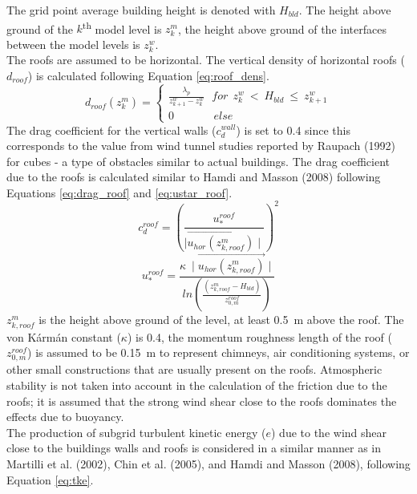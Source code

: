 %
The grid point average building height is denoted with $H_{bld}$. The height above ground of
the $k$\textsuperscript{th} model level is $z^{m}_{k}$, the height above ground of the interfaces
between the model levels is $z^{w}_{k}$. \\
%
The roofs are assumed to be horizontal. The vertical density of horizontal roofs ($d_{roof}$)
is calculated following Equation \ref{eq:roof_dens}.
%
\begin{equation}
\label{eq:roof_dens}
d_{roof}(z^{m}_{k})= 
\begin{cases}
\frac{\lambda_{p}} {z^{w}_{k+1}-z^{w}_{k}} \ \ \ for \ \ z^{w}_{k} \ < \ H_{bld} \ \leq \ z^{w}_{k+1} \\
0 \ \ \ \ \ \ \ \ \ \ \ \ \ \ \ \ else
\end{cases}
\end{equation}
%
The drag coefficient for the vertical walls ($c_{d}^{wall}$) is set to 0.4 since this corresponds
to the value from wind tunnel studies reported by Raupach (1992) for cubes - a type of
obstacles similar to actual buildings. The drag coefficient due to the roofs is calculated
similar to Hamdi and Masson (2008) following Equations \ref{eq:drag_roof} and \ref{eq:ustar_roof}.
%
\begin{equation}
\label{eq:drag_roof}
c_{d}^{roof}=\left( \frac{u^{roof}_{*}}{\mid \vec{u_{hor}(z^{m}_{k,roof})} \mid} \right)^{2}
\end{equation}
%
\begin{equation}
\label{eq:ustar_roof}
u^{roof}_{*}= \frac{\kappa \ \mid \vec{u_{hor}(z^{m}_{k,roof})} \mid}{ln \left( \frac{(z^{m}_{k,roof}-H_{bld})}{z^{roof}_{0,m}} \right)}
\end{equation}
%
$z^{m}_{k,roof}$ is the height above ground of the level, at least 0.5~m above the roof.
The von K\'arm\'an constant ($\kappa$) is 0.4, the momentum roughness length of the
roof ($z^{roof}_{0,m}$) is assumed to be 0.15~m to represent chimneys, air conditioning systems,
or other small constructions that are usually present on the roofs. Atmospheric stability
is not taken into account in the calculation of the friction due to the roofs;
it is assumed that the strong wind shear close to the roofs dominates the effects due to buoyancy. \\
%
The production of subgrid turbulent kinetic energy ($e$) due to the wind shear close to
the buildings walls and roofs is considered in a similar manner as in Martilli et al. (2002),
Chin et al. (2005), and Hamdi and Masson (2008), following Equation \ref{eq:tke}.
